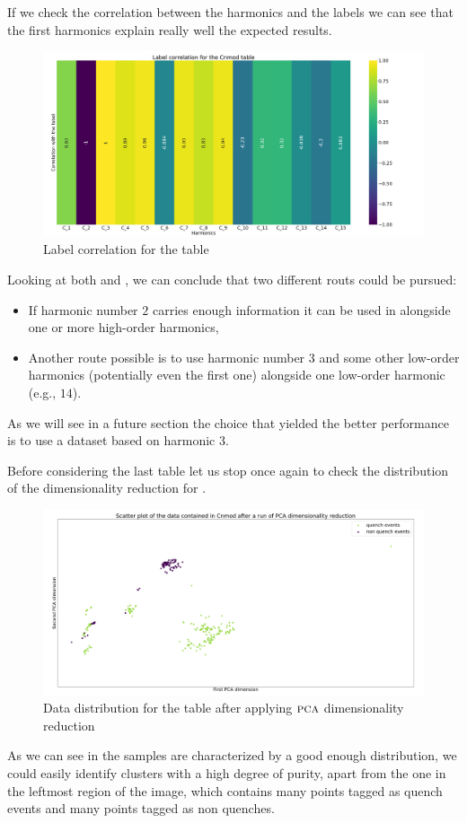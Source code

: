 If we check the correlation between the harmonics and the labels  we can see
that the first harmonics explain really well the expected results.
\begin{figure}[h!]
	\centering
	\includegraphics[width=\linewidth]{img/Cnmod_label_corr.png}
	\caption{Label correlation for the \cnmod table} \label{fig:cnmod-lcorr}
\end{figure}

Looking at both  and , we can conclude that two different
routs could be pursued:
\begin{itemize}
	\item If harmonic number $2$ carries enough information it can be used in alongside one or
	      more high-order harmonics,
	\item Another route possible is to use harmonic number $3$ and some other low-order
	      harmonics (potentially even the first one) alongside one low-order harmonic (e.g.,
	      $14$).
\end{itemize}
As we will see in a future section the choice that yielded the better performance is to use a
dataset based on harmonic $3$.

Before considering the last table let us stop once again to check the distribution of the
dimensionality reduction for \cnmod.
\begin{figure}[h!]
	\centering
	\includegraphics[width=\linewidth]{img/Cnmod_distribution.png}
	\caption{Data distribution for the \cnmod table after applying $\textsc{pca}$ dimensionality
		reduction} \label{fig:cnmod-dist}
\end{figure}
As we can see in  the samples are characterized by a good enough distribution,
we could easily identify clusters with a high degree of purity, apart from the one in the leftmost
region of the image, which contains many points tagged as quench events and many points tagged as
non quenches.

